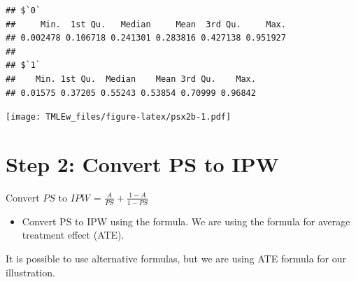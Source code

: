 \documentclass[
]{book}
\newenvironment{Shaded}{\begin{snugshade}}{\end{snugshade}}
\newcommand{\AttributeTok}[1]{\textcolor[rgb]{0.77,0.63,0.00}{#1}}
\newcommand{\DecValTok}[1]{\textcolor[rgb]{0.00,0.00,0.81}{#1}}
\newcommand{\FunctionTok}[1]{\textcolor[rgb]{0.00,0.00,0.00}{#1}}
\newcommand{\NormalTok}[1]{#1}
\newcommand{\SpecialCharTok}[1]{\textcolor[rgb]{0.00,0.00,0.00}{#1}}
\newcommand{\StringTok}[1]{\textcolor[rgb]{0.31,0.60,0.02}{#1}}
\providecommand{\tightlist}{%
  \setlength{\itemsep}{0pt}\setlength{\parskip}{0pt}}
\begin{document}
\begin{verbatim}
## $`0`
##     Min.  1st Qu.   Median     Mean  3rd Qu.     Max. 
## 0.002478 0.106718 0.241301 0.283816 0.427138 0.951927 
## 
## $`1`
##    Min. 1st Qu.  Median    Mean 3rd Qu.    Max. 
## 0.01575 0.37205 0.55243 0.53854 0.70999 0.96842
\end{verbatim}

\begin{Shaded}
\end{Shaded}

\texttt{[image: TMLEw\_files/figure-latex/psx2b-1.pdf]}

\hypertarget{step-2-convert-ps-to-ipw}{%
\section{Step 2: Convert PS to IPW}\label{step-2-convert-ps-to-ipw}}

\begin{rmdcomment}
Convert \(PS\) to \(IPW\) = \(\frac{A}{PS} + \frac{1-A}{1-PS}\)
\end{rmdcomment}

\begin{itemize}
\tightlist
\item
  Convert PS to IPW using the formula. We are using the formula for average treatment effect (ATE).
\end{itemize}

\begin{rmdcomment}
It is possible to use alternative formulas, but we are using ATE formula
for our illustration.
\end{rmdcomment}
\end{document}
